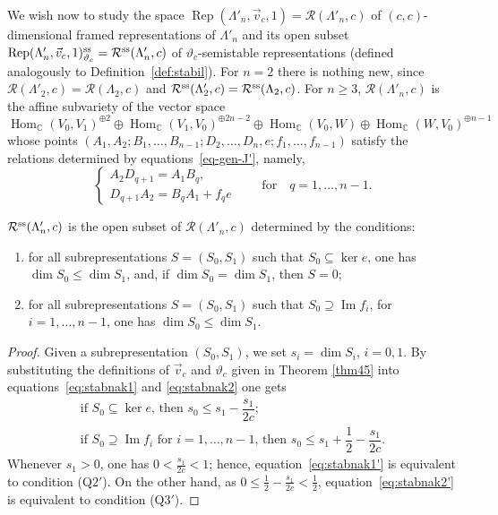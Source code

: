 We wish now to study the space $\operatorname{Rep}(\Lambda'_n, \vec{v}_c, 1) = \mathcal{R}(\Lambda'_n, c)$
of $(c,c)$-dimensional framed representations of $\Lambda'_{n}$ and its open subset
 $\operatorname{Rep}(\Lambda'_n, \vec{v}_c, 1)_{\vartheta_c}^{\rm ss} = \mathcal{R}^{\rm ss}(\Lambda'_n, c)$ of $\vartheta_c$-semistable representations
 (defined analogously to Definition~\ref{def:stabil}).
 For $n=2$ there is nothing new, since
 $\mathcal{R}(\Lambda'_2, c)=\mathcal{R}(\Lambda_2, c)$ and $\mathcal{R}^{\rm ss}(\Lambda'_2, c) = \mathcal{R}^{\rm ss}(\Lambda_2, c)$.
 For $n\geq3$, $\mathcal{R}(\Lambda'_n, c)$ is the affine subvariety of the vector space
\begin{equation*}
\operatorname{Hom}_\mathbb{C}(V_0,V_1)^{\oplus 2}\oplus\operatorname{Hom}_\mathbb{C}(V_1,V_0)^{\oplus 2n-2}\oplus\operatorname{Hom}_\mathbb{C}(V_0,W)\oplus\operatorname{Hom}_\mathbb{C}(W,V_0)^{\oplus n-1}
\end{equation*}
whose points $(A_1,A_2;B_1,\dots,B_{n-1};D_{2},\dots,D_{n},e;f_1,\dots,f_{n-1})$ satisfy the relations
determined by equations~\eqref{eq-gen-J'}, namely,
\begin{equation}
\begin{cases}
A_2D_{q+1}=A_1B_q,\\
D_{q+1}A_2=B_qA_1+f_{q}e
\end{cases}\qquad\text{for}\quad q=1,\dots,n-1 .
\label{eq-(Q1')}\tag{\rm Q$1'$}
\end{equation}

\begin{Lemma}\label{Q-Lemma}
$\mathcal{R}^{\rm ss}(\Lambda'_{n}, c)$ is the open subset of $\mathcal{R}(\Lambda'_{n}, c)$ determined by the conditions:
\begin{enumerate}\itemsep=0pt
 \item[\rm{(Q$2'$)}]
 for all subrepresentations $S=(S_0,S_1)$ such that $S_0\subseteq\ker e$, one has $\dim S_0\leq\dim S_1$, and, if $\dim S_0=\dim S_1$, then $S=0$;
 \item[\rm{(Q$3'$)}]
 for all subrepresentations $S=(S_0,S_1)$ such that $S_0\supseteq\operatorname{Im} f_i$, for $i=1,\dots,n-1$, one has $\dim S_0\leq\dim S_1$.
\end{enumerate}
\end{Lemma}
\begin{proof}
Given a subrepresentation $(S_{0},S_{1})$, we set $s_{i}=\dim S_{i}$, $i=0,1$. By substituting the definitions of $\vec{v}_c$ and $\vartheta_c$ given in Theorem \ref{thm45} into equations~\eqref{eq:stabnak1} and \eqref{eq:stabnak2} one gets
\begin{gather}
 \text{if $S_0\subseteq \ker e$, then $s_{0}\leq s_1-\dfrac{s_1}{2c}$} ;\label{eq:stabnak1'}\\
\text{if $S_0\supseteq \operatorname{Im} f_i$ for $i=1,\dots,n-1$, then $s_{0}\leq s_{1}+\dfrac{1}{2}-\dfrac{s_{1}}{2c}$} .\label{eq:stabnak2'}
\end{gather}
Whenever $s_1>0$, one has $0<\frac{s_1}{2c}<1$; hence, equation~\eqref{eq:stabnak1'} is equivalent to condition \rm{(Q$2'$)}. On the other hand, as $0\leq\frac{1}{2}-\frac{s_{1}}{2c}<\frac{1}{2}$, equation~\eqref{eq:stabnak2'} is equivalent to condition \rm{(Q$3'$)}.
\end{proof}

